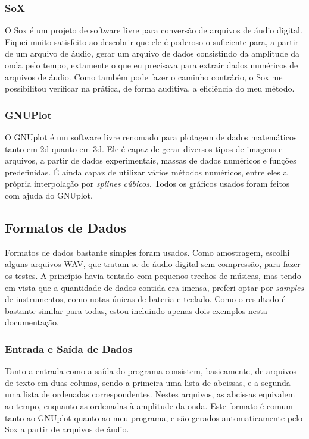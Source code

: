 \subsubsection{SoX}

O Sox é um projeto de software livre para conversão de arquivos de áudio digital. Fiquei muito satisfeito ao descobrir que ele é poderoso o suficiente para, a partir de um arquivo de áudio, gerar um arquivo de dados consistindo da amplitude da onda pelo tempo, extamente o que eu precisava para extrair dados numéricos de arquivos de áudio. Como também pode fazer o caminho contrário, o Sox me possibilitou verificar na prática, de forma auditiva, a eficiência do meu método.

\subsubsection{GNUPlot}

O GNUplot é um software livre renomado para plotagem de dados matemáticos tanto em 2d quanto em 3d. Ele é capaz de gerar diversos tipos de imagens e arquivos, a partir de dados experimentais, massas de dados numéricos e funções predefinidas. É ainda capaz de utilizar vários métodos numéricos, entre eles a própria interpolação por \textit{splines cúbicos}. Todos os gráficos usados foram feitos com ajuda do GNUplot.

\subsection{Formatos de Dados}

Formatos de dados bastante simples foram usados. Como amostragem, escolhi alguns arquivos WAV, que tratam-se de áudio digital sem compressão, para fazer os testes. A princípio havia tentado com pequenos trechos de músicas, mas tendo em vista que a quantidade de dados contida era imensa, preferi optar por \textit{samples} de instrumentos, como notas únicas de bateria e teclado. Como o resultado é bastante similar para todas, estou incluindo apenas dois exemplos nesta documentação.


\subsubsection{Entrada e Saída de Dados}

Tanto a entrada como a saída do programa consistem, basicamente, de arquivos de texto em duas colunas, sendo a primeira uma lista de abcissas, e a segunda uma lista de ordenadas correspondentes. Nestes arquivos, as abcissas equivalem ao tempo, enquanto as ordenadas à amplitude da onda. Este formato é comum tanto ao GNUplot quanto ao meu programa, e são gerados automaticamente pelo Sox a partir de arquivos de áudio.

